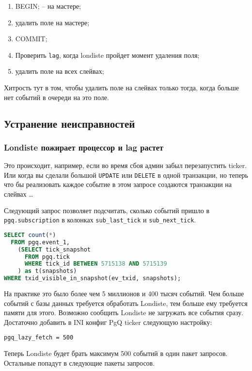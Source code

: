 \begin{enumerate}
 \item BEGIN; -- на мастере;
 \item удалить поле на мастере;
 \item COMMIT;
 \item Проверить \lstinline!lag!, когда londiste пройдет момент удаления поля;
 \item удалить поле на всех слейвах;
\end{enumerate}

Хитрость тут в том, чтобы удалить поле на слейвах только тогда, когда больше нет событий в очереди на это поле.


\subsection{Устранение неисправностей}

\subsubsection{Londiste пожирает процессор и lag растет}

Это происходит, например, если во время сбоя админ забыл перезапустить ticker. Или когда вы сделали большой \lstinline!UPDATE! или \lstinline!DELETE! в одной транзакции, но теперь что бы реализовать каждое событие в этом запросе создаются транзакции на слейвах \dots

Следующий запрос позволяет подсчитать, сколько событий пришло в \lstinline!pgq.subscription! в колонках \lstinline!sub_last_tick! и \lstinline!sub_next_tick!.

\begin{lstlisting}[language=SQL,label=lst:londiste24,caption=Устранение неисправностей]
SELECT count(*)
  FROM pgq.event_1,
    (SELECT tick_snapshot
      FROM pgq.tick
      WHERE tick_id BETWEEN 5715138 AND 5715139
    ) as t(snapshots)
WHERE txid_visible_in_snapshot(ev_txid, snapshots);
\end{lstlisting}

На практике это было более чем 5 миллионов и 400 тысяч событий. Чем больше событий с базы данных требуется обработать Londiste, тем больше ему требуется памяти для этого. Возможно сообщить Londiste не загружать все события сразу. Достаточно добавить в INI конфиг PgQ ticker следующую настройку:

\begin{lstlisting}[label=lst:londiste25,caption=Устранение неисправностей]
pgq_lazy_fetch = 500
\end{lstlisting}

Теперь Londiste будет брать максимум 500 событий в один пакет запросов. Остальные попадут в следующие пакеты запросов.
